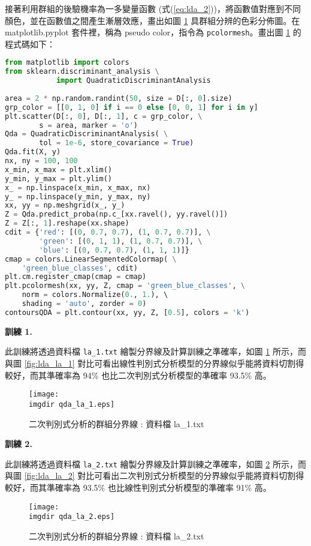 接著利用群組的後驗機率為一多變量函數 (式(\ref{eq:lda_2}))，將函數值對應到不同顏色，並在函數值之間產生漸層效應，畫出如圖 \ref{fig:qda_la_1} 具群組分辨的色彩分佈圖。在 matplotlib.pyplot 套件裡，稱為 pseudo color，指令為 \verb|pcolormesh|。畫出圖 \ref{fig:qda_la_1} 的程式碼如下：
\bigskip
\begin{lstlisting}[language = Python]
from matplotlib import colors
from sklearn.discriminant_analysis \
			import QuadraticDiscriminantAnalysis
		
area = 2 * np.random.randint(50, size = D[:, 0].size)
grp_color = [[0, 1, 0] if i == 0 else [0, 0, 1] for i in y]
plt.scatter(D[:, 0], D[:, 1], c = grp_color, \
		s = area, marker = 'o')
Qda = QuadraticDiscriminantAnalysis( \
		tol = 1e-6, store_covariance = True)
Qda.fit(X, y)
nx, ny = 100, 100
x_min, x_max = plt.xlim()
y_min, y_max = plt.ylim()
x_ = np.linspace(x_min, x_max, nx)
y_ = np.linspace(y_min, y_max, ny)
xx, yy = np.meshgrid(x_, y_)
Z = Qda.predict_proba(np.c_[xx.ravel(), yy.ravel()])
Z = Z[:, 1].reshape(xx.shape)
cdit = {'red': [(0, 0.7, 0.7), (1, 0.7, 0.7)], \
    	'green': [(0, 1, 1), (1, 0.7, 0.7)], \
    	'blue': [(0, 0.7, 0.7), (1, 1, 1)]}
cmap = colors.LinearSegmentedColormap( \
	'green_blue_classes', cdit)
plt.cm.register_cmap(cmap = cmap)
plt.pcolormesh(xx, yy, Z, cmap = 'green_blue_classes', \
	norm = colors.Normalize(0., 1.), \ 
	shading = 'auto', zorder = 0)
contoursQDA = plt.contour(xx, yy, Z, [0.5], colors = 'k')
\end{lstlisting}

\textbf{\large 訓練 1.}

此訓練將透過資料檔 \verb|la_1.txt| 繪製分界線及計算訓練之準確率，如圖 \ref{fig:qda_la_1} 所示，而與圖 \ref{fig:lda_la_1} 對比可看出線性判別式分析模型的分界線似乎能將資料切割得較好，而其準確率為 94\% 也比二次判別式分析模型的準確率 93.5\% 高。

\begin{figure}[H]
    \centering
        \texttt{[image: \\imgdir qda\_la\_1.eps]}
    \caption{二次判別式分析的群組分界線 : 資料檔 la\_1.txt}
    \label{fig:qda_la_1}
\end{figure}

\textbf{\large 訓練 2.}

此訓練將透過資料檔 \verb|la_2.txt| 繪製分界線及計算訓練之準確率，如圖 \ref{fig:qda_la_2} 所示，而與圖 \ref{fig:lda_la_2} 對比可看出二次判別式分析模型的分界線似乎能將資料切割得較好，而其準確率為 93.5\% 也比線性判別式分析模型的準確率 91\% 高。

\begin{figure}[H]
    \centering
        \texttt{[image: \\imgdir qda\_la\_2.eps]}
    \caption{二次判別式分析的群組分界線 : 資料檔 la\_2.txt}
    \label{fig:qda_la_2}
\end{figure}


